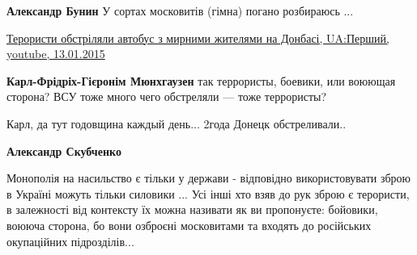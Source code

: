 \begin{itemize}
\begin{itemize}
\textbf{Александр Бунин} У сортах московитів (гімна) погано розбираюсь ...
\end{itemize}

 

\href{https://youtu.be/3U7dCpXWZA8}{%
Терористи обстріляли автобус з мирними жителями на Донбасі, %
UA:Перший, youtube, 13.01.2015%
}

\begin{itemize}
 
\textbf{Карл-Фрідріх-Гієронім Мюнхгаузен} так террористы, боевики, или воюющая сторона? ВСУ тоже много чего обстреляли — тоже террористы?

 
Карл, да тут годовщина каждый день... 2года Донецк обстреливали..

 
\textbf{Александр Скубченко} 

Монополія на насильство є тільки у держави - відповідно використовувати зброю в
Україні можуть тільки силовики ... Усі інші хто взяв до рук зброю є терористи, в
залежності від контексту їх можна називати як ви пропонуєте: бойовики, воююча
сторона, бо вони озброєні московитами та входять до російських окупаційних
підрозділів...

\end{itemize}

 

\end{itemize}
